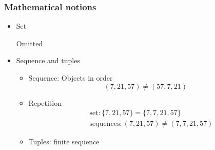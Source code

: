 



\begin{frame}[allowframebreaks] \frametitle{Mathematical notions}
  \begin{itemize}

\item Set

Omitted
\item Sequence and tuples

  \begin{itemize}
  \item Sequence: Objects in order
    \begin{equation*}
      (7,21,57) \neq (57,7,21)
    \end{equation*}
  \item Repetition
    \begin{eqnarray*}
      && \mbox{set}: \{7,21,57\}=\{7,7,21,57\}\\
&& \mbox{sequences}: (7,21,57) \neq (7,7,21,57)
    \end{eqnarray*}
  \item Tuples: finite sequence


\end{itemize}
\end{itemize}
\end{frame}

